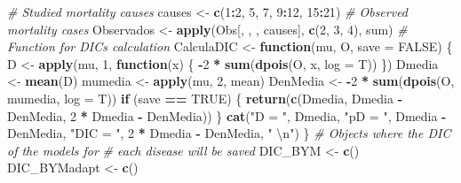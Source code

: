 \documentclass[]{article}
\newenvironment{Shaded}{\begin{snugshade}}{\end{snugshade}}
\newcommand{\KeywordTok}[1]{\textcolor[rgb]{0.13,0.29,0.53}{\textbf{#1}}}
\newcommand{\DataTypeTok}[1]{\textcolor[rgb]{0.13,0.29,0.53}{#1}}
\newcommand{\DecValTok}[1]{\textcolor[rgb]{0.00,0.00,0.81}{#1}}
\newcommand{\CharTok}[1]{\textcolor[rgb]{0.31,0.60,0.02}{#1}}
\newcommand{\StringTok}[1]{\textcolor[rgb]{0.31,0.60,0.02}{#1}}
\newcommand{\CommentTok}[1]{\textcolor[rgb]{0.56,0.35,0.01}{\textit{#1}}}
\newcommand{\OtherTok}[1]{\textcolor[rgb]{0.56,0.35,0.01}{#1}}
\newcommand{\ControlFlowTok}[1]{\textcolor[rgb]{0.13,0.29,0.53}{\textbf{#1}}}
\newcommand{\OperatorTok}[1]{\textcolor[rgb]{0.81,0.36,0.00}{\textbf{#1}}}
\newcommand{\NormalTok}[1]{#1}
\begin{document}
\begin{Shaded}
\begin{Highlighting}[]
\CommentTok{# Studied mortality causes}
\NormalTok{causes <-}\StringTok{ }\KeywordTok{c}\NormalTok{(}\DecValTok{1}\OperatorTok{:}\DecValTok{2}\NormalTok{, }\DecValTok{5}\NormalTok{, }\DecValTok{7}\NormalTok{, }\DecValTok{9}\OperatorTok{:}\DecValTok{12}\NormalTok{, }\DecValTok{15}\OperatorTok{:}\DecValTok{21}\NormalTok{)}
\CommentTok{# Observed mortality cases}
\NormalTok{Observados <-}\StringTok{ }\KeywordTok{apply}\NormalTok{(Obs[, , , causes], }\KeywordTok{c}\NormalTok{(}\DecValTok{2}\NormalTok{, }
    \DecValTok{3}\NormalTok{, }\DecValTok{4}\NormalTok{), sum)}
\CommentTok{# Function for DICs calculation}
\NormalTok{CalculaDIC <-}\StringTok{ }\ControlFlowTok{function}\NormalTok{(mu, O, }\DataTypeTok{save =} \OtherTok{FALSE}\NormalTok{) \{}
\NormalTok{    D <-}\StringTok{ }\KeywordTok{apply}\NormalTok{(mu, }\DecValTok{1}\NormalTok{, }\ControlFlowTok{function}\NormalTok{(x) \{}
        \OperatorTok{-}\DecValTok{2} \OperatorTok{*}\StringTok{ }\KeywordTok{sum}\NormalTok{(}\KeywordTok{dpois}\NormalTok{(O, x, }\DataTypeTok{log =}\NormalTok{ T))}
\NormalTok{    \})}
\NormalTok{    Dmedia <-}\StringTok{ }\KeywordTok{mean}\NormalTok{(D)}
\NormalTok{    mumedia <-}\StringTok{ }\KeywordTok{apply}\NormalTok{(mu, }\DecValTok{2}\NormalTok{, mean)}
\NormalTok{    DenMedia <-}\StringTok{ }\OperatorTok{-}\DecValTok{2} \OperatorTok{*}\StringTok{ }\KeywordTok{sum}\NormalTok{(}\KeywordTok{dpois}\NormalTok{(O, mumedia, }
        \DataTypeTok{log =}\NormalTok{ T))}
    \ControlFlowTok{if}\NormalTok{ (save }\OperatorTok{==}\StringTok{ }\OtherTok{TRUE}\NormalTok{) \{}
        \KeywordTok{return}\NormalTok{(}\KeywordTok{c}\NormalTok{(Dmedia, Dmedia }\OperatorTok{-}\StringTok{ }\NormalTok{DenMedia, }
            \DecValTok{2} \OperatorTok{*}\StringTok{ }\NormalTok{Dmedia }\OperatorTok{-}\StringTok{ }\NormalTok{DenMedia))}
\NormalTok{    \}}
    \KeywordTok{cat}\NormalTok{(}\StringTok{"D = "}\NormalTok{, Dmedia, }\StringTok{"pD = "}\NormalTok{, Dmedia }\OperatorTok{-}\StringTok{ }
\StringTok{        }\NormalTok{DenMedia, }\StringTok{"DIC = "}\NormalTok{, }\DecValTok{2} \OperatorTok{*}\StringTok{ }\NormalTok{Dmedia }\OperatorTok{-}\StringTok{ }
\StringTok{        }\NormalTok{DenMedia, }\StringTok{" }\CharTok{\textbackslash{}n}\StringTok{"}\NormalTok{)}
\NormalTok{\}}
\CommentTok{# Objects where the DIC of the models for}
\CommentTok{# each disease will be saved}
\NormalTok{DIC_BYM <-}\StringTok{ }\KeywordTok{c}\NormalTok{()}
\NormalTok{DIC_BYMadapt <-}\StringTok{ }\KeywordTok{c}\NormalTok{()}

\end{Highlighting}
\end{Shaded}
\end{document}
